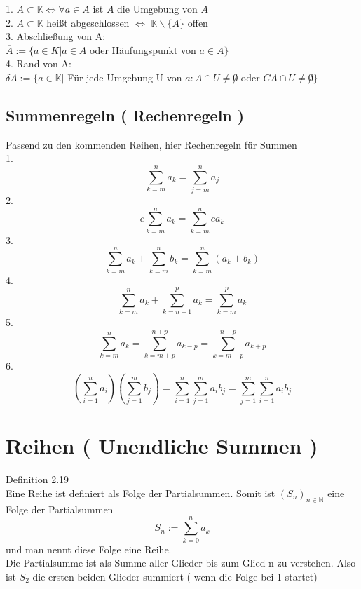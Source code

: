 \documentclass[smallheadings,headsepline,12pt,a4paper]{scrartcl}
\begin{document}
1. $ A \subset \mathbb{K} \Leftrightarrow \forall a \in A $ ist $A$ die Umgebung von $A$ \\
2.  $ A \subset \mathbb{K}$ heißt abgeschlossen $\Leftrightarrow$ $\mathbb{K} \backslash \{A\}$ offen \\
3. Abschließung von A: \\
$ \overline{A}:= \{a \in K | a \in A $ oder Häufungspunkt von $a \in A \}$ \\

4. Rand von A: \\
$\delta A:= \{a \in \mathbb{K}| $ Für jede Umgebung U von $a:A\cap U \neq \not 0$ oder $CA \cap U \neq \not 0 \}$\\

\newpage

\subsection*{Summenregeln ( Rechenregeln )}

Passend zu den kommenden Reihen, hier Rechenregeln für Summen \\

1. $$ \sum\limits_{k=m}^n a_k = \sum\limits_{j=m}^n a_j $$ 
2. $$ c  \sum\limits_{k=m}^n a_k = \sum\limits_{k=m}^n c a_k $$
3. $$ \sum\limits_{k=m}^n a_k + \sum\limits_{k=m}^n b_k = \sum\limits_{k=m}^n (a_k + b_k) $$
4. $$ \sum\limits_{k=m}^n a_k +\sum\limits_{k=n+1}^p a_k = \sum\limits_{k=m}^p a_k $$
5. $$ \sum\limits_{k=m}^n a_k = \sum\limits_{k=m+p}^{n+p} a_{k-p} = \sum\limits_{k=m-p}^{n-p} a_{k+p} $$
6. $$ ( \sum\limits_{i=1}^n a_i ) ( \sum\limits_{j=1}^m b_j ) = \sum\limits_{i=1}^n  \sum\limits_{j=1}^m a_i b_j 
= \sum\limits_{j=1}^m \sum\limits_{i=1}^n  a_i b_j $$ 

\newpage

\section*{Reihen ( Unendliche Summen ) }

Definition 2.19 \\
Eine Reihe ist definiert als Folge der Partialsummen. Somit ist $(S_n)_{n\in \mathbb{N}}$ eine Folge der Partialsummen \\
$$ S_n:= \sum\limits_{k=0}^n a_k $$
und man nennt diese Folge eine Reihe. \\
Die Partialsumme ist als Summe aller Glieder bis zum Glied n zu verstehen. Also ist $S_2$ die ersten beiden Glieder summiert 
( wenn die Folge bei 1 startet) \\
\end{document}
